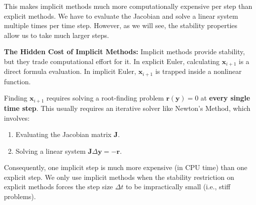 This makes implicit methods much more computationally expensive per step than explicit methods. We have to evaluate the Jacobian and solve a linear system multiple times per time step. However, as we will see, the stability properties allow us to take much larger steps.

\begin{warningBox}
    \textbf{The Hidden Cost of Implicit Methods:} Implicit methods provide stability, but they trade computational effort for it. In explicit Euler, calculating $\mathbf{x}_{i+1}$ is a direct formula evaluation. In implicit Euler, $\mathbf{x}_{i+1}$ is trapped inside a nonlinear function. 
    
    Finding $\mathbf{x}_{i+1}$ requires solving a root-finding problem $\mathbf{r}(\mathbf{y}) = 0$ at \textbf{every single time step}. This usually requires an iterative solver like Newton's Method, which involves:
    \begin{enumerate}
        \item Evaluating the Jacobian matrix $\mathbf{J}$.
        \item Solving a linear system $\mathbf{J} \Delta \mathbf{y} = -\mathbf{r}$.
    \end{enumerate}
    Consequently, one implicit step is much more expensive (in CPU time) than one explicit step. We only use implicit methods when the stability restriction on explicit methods forces the step size $\Delta t$ to be impractically small (i.e., stiff problems).
\end{warningBox}


